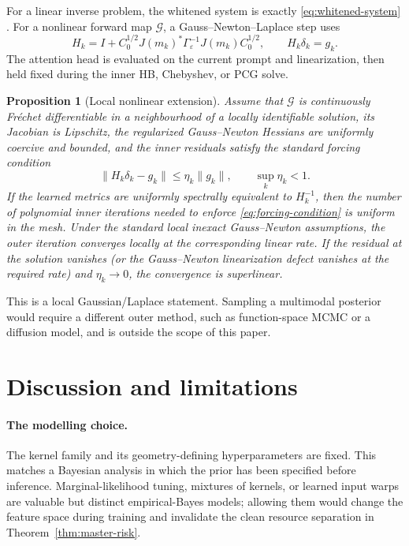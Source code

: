 \documentclass[11pt,a4paper]{article}
\numberwithin{equation}{section}
\newtheorem{proposition}[theorem]{Proposition}
\theoremstyle{definition}
\theoremstyle{remark}
\begin{document}
For a linear inverse problem, the whitened system is exactly
\eqref{eq:whitened-system} \citep{stuart2010inverse}.  For a nonlinear forward map $\mathcal G$, a
Gauss--Newton--Laplace step uses
\begin{equation}
 H_k=I+C_0^{1/2}J(m_k)^*\Gamma_\varepsilon^{-1}J(m_k)C_0^{1/2},
 \qquad
 H_k\delta_k=g_k.
 \label{eq:gauss-newton}
\end{equation}
The attention head is evaluated on the current prompt and linearization, then
held fixed during the inner HB, Chebyshev, or PCG solve.

\begin{proposition}[Local nonlinear extension]
\label{prop:gauss-newton}
Assume that $\mathcal G$ is continuously Fr\'echet differentiable in a
neighbourhood of a locally identifiable solution, its Jacobian is Lipschitz,
the regularized Gauss--Newton Hessians are uniformly coercive and bounded, and
the inner residuals satisfy the standard forcing condition
\begin{equation}
 \|H_k\delta_k-g_k\|\le\eta_k\|g_k\|,
 \qquad \sup_k\eta_k<1.
 \label{eq:forcing-condition}
\end{equation}
If the learned metrics are uniformly spectrally equivalent to $H_k^{-1}$,
then the number of polynomial inner iterations needed to enforce
\eqref{eq:forcing-condition} is uniform in the mesh. Under the standard local
inexact Gauss--Newton assumptions, the outer iteration converges locally at
the corresponding linear rate. If the residual at the solution vanishes (or
the Gauss--Newton linearization defect vanishes at the required rate) and
\(\eta_k\to0\), the convergence is superlinear.
\end{proposition}

This is a local Gaussian/Laplace statement.  Sampling a multimodal posterior
would require a different outer method, such as function-space MCMC or a
diffusion model, and is outside the scope of this paper.

\FloatBarrier


\section{Discussion and limitations}

\paragraph{The modelling choice.}
The kernel family and its geometry-defining hyperparameters are fixed.  This
matches a Bayesian analysis in which the prior has been specified before
inference.  Marginal-likelihood tuning, mixtures of kernels, or learned input
warps are valuable but distinct empirical-Bayes models; allowing them would
change the feature space during training and invalidate the clean resource
separation in Theorem~\ref{thm:master-risk}.
\end{document}
